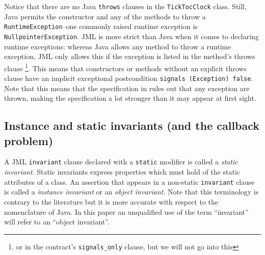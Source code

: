 \documentclass{llncs}
\begin{document}
Notice that there are no Java \texttt{throws} clauses in the \texttt{TickTocClock} 
class.  Still, Java permits the constructor and any of the methods to throw a 
\texttt{RuntimeException}--one commonly raised runtime exception is 
\texttt{NullpointerException}.
%
JML is more strict than Java when it comes to declaring runtime exceptions: 
whereas Java allows any method to throw a runtime exception, JML only 
allows this if the exception is listed in the method's throws clause
\footnote{or in the contract's \texttt{signals\_only} clause, but we will not go 
into this}.
This means that constructors or methods without an explicit throws clause
have an implicit exceptional postcondition \texttt{signals (Exception) false}.
Note that this means that the specification in  
rules out that any exception are thrown, making the specification a lot stronger 
than it may appear at first sight.

\subsection{Instance and static invariants (and the callback problem)}

A JML \texttt{invariant} clause declared with a
\texttt{static} modifier is called a \emph{static invariant}.
%
Static invariants express properties which must hold of the static
attributes of a class.
%
An assertion that appears in a non-static \texttt{invariant} clause is called
a \emph{instance invariant} or an \emph{object invariant}.
%
Note that this terminology is contrary to the literature but it is more
accurate with respect to the nomenclature of Java.  In this paper an
unqualified use of the term ``invariant'' will refer to an ``object
invariant''.

%
%
%
\end{document}
